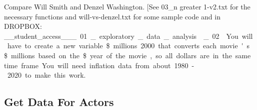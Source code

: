 \documentclass[
]{article}
\newenvironment{Shaded}{\begin{snugshade}}{\end{snugshade}}
\newcommand{\CommentTok}[1]{\textcolor[rgb]{0.56,0.35,0.01}{\textit{#1}}}
\newcommand{\DataTypeTok}[1]{\textcolor[rgb]{0.13,0.29,0.53}{#1}}
\newcommand{\FloatTok}[1]{\textcolor[rgb]{0.00,0.00,0.81}{#1}}
\newcommand{\KeywordTok}[1]{\textcolor[rgb]{0.13,0.29,0.53}{\textbf{#1}}}
\newcommand{\NormalTok}[1]{#1}
\newcommand{\OperatorTok}[1]{\textcolor[rgb]{0.81,0.36,0.00}{\textbf{#1}}}
\newcommand{\StringTok}[1]{\textcolor[rgb]{0.31,0.60,0.02}{#1}}
\begin{document}
\begin{Shaded}
\begin{Highlighting}[]
Compare Will Smith and Denzel Washington. {[}See 03\_n greater 1-v2.txt
for the necessary functions and will-vs-denzel.txt for some sample code
and in DROPBOX:
\_\_student\_access\_\_\unit\_01\_exploratory\_data\_analysis\week\_02\imdbexample {]}
You will have to create a new variable \$millions.2000 that converts
each movie's \$millions based on the \$year of the movie, so all dollars
are in the same time frame. You will need inflation data from about
1980-2020 to make this work.

\hypertarget{get-data-for-actors}{%
\subsection{Get Data For Actors}\label{get-data-for-actors}}

\begin{Shaded}
\end{Shaded}


\end{Highlighting}
\end{Shaded}
\end{document}
